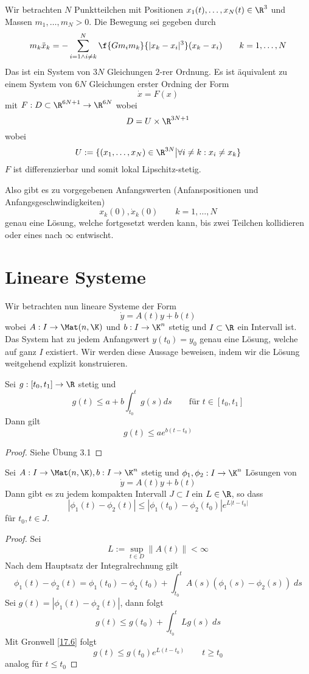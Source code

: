 \documentclass{mycourse}
\begin{document}
\begin{ex*}
	Wir betrachten $N$ Punktteilchen mit Positionen $x_1(t),\dotsc, x_N(t)\in \R^3$ und Massen $m_1,\dotsc,m_N>0$.
	Die Bewegung sei gegeben durch
	\[
		m_k \ddot x_k = -\sum_{i=1 \land i\neq k}^N \f{Gm_im_k}{|x_k-x_i|^3}(x_k-x_i) \qquad k=1,\dotsc, N
	\]
	Das ist ein System von $3N$ Gleichungen $2$-rer Ordnung.
	Es ist äquivalent zu einem System von $6N$ Gleichungen erster Ordning der Form
	\[
		\dot x = F(x)
	\]
	mit $F:D\subset \R^{6N+1}\to \R^{6N}$ wobei
	\[
		D = U \times \R^{3N+1}
	\]
	wobei
	\[
		U := \{(x_1,\dotsc,x_N)\in \R^{3N}\big| \forall i\neq k: x_i\neq x_k \}
	\]
	$F$ ist differenzierbar und somit lokal Lipschitz-stetig.

	Also gibt es zu vorgegebenen Anfangswerten (Anfanspositionen und Anfangsgeschwindigkeiten)
	\[
		x_k(0), \dot x_k(0) \qquad k=1,\dotsc, N
	\]
	genau eine Lösung, welche fortgesetzt werden kann, bis zwei Teilchen kollidieren oder eines nach $\infty$ entwischt.
\end{ex*}


\section{Lineare Systeme}


Wir betrachten nun lineare Systeme der Form
\[
	\dot y = A(t) y + b(t)
\]
wobei $A: I \to \Mat(n,\K)$ und $b :I \to \K^n$ stetig und $I\subset \R$ ein Intervall ist.
Das System hat zu jedem Anfangswert $y(t_0) = y_0$ genau eine Lösung, welche auf ganz $I$ existiert.
Wir werden diese Aussage beweisen, indem wir die Lösung weitgehend explizit konstruieren.

\begin{lem}[Gronwell]
	\label{17.6}
	Sei $g: [t_0,t_1] \to \R$ stetig und
	\[
		g(t) \le a + b\int_{t_0}^t g(s) ds \qquad \text{für $t\in [t_0,t_1]$}
	\]
	Dann gilt
	\[
		g(t) \le ae^{b(t-t_0)}
	\]
	\begin{proof}	
		Siehe Übung 3.1
	\end{proof}
\end{lem}

\begin{st}
	\label{17.7}
	Sei $A:I \to \Mat(n,\K), b:I\to \K^n$ stetig und $\phi_1,\phi_2: I \to \K^n$ Lösungen von
	\[
		\dot y = A(t) y + b(t)
	\]
	Dann gibt es zu jedem kompakten Intervall $J\subset I$ ein $L\in \R$, so dass
	\[
		|\phi_1(t) - \phi_2(t)| \le |\phi_1(t_0) -\phi_2(t_0)| e^{L|t-t_0|}
	\]
	für $t_0, t\in J$.
	\begin{proof}
		Sei
		\[
			L := \sup_{t\in D}\|A(t)\| < \infty
		\]
		Nach dem Hauptsatz der Integralrechnung gilt
		\[
			\phi_1(t) - \phi_2(t) = \phi_1(t_0) - \phi_2(t_0) + \int_{t_0}^t A(s) (\phi_1(s) - \phi_2(s))\; ds
		\]
		Sei $g(t) = |\phi_1(t) - \phi_2(t)|$, dann folgt
		\[
			g(t) \le g(t_0) + \int_{t_0}^tLg(s)\; ds
		\]
		Mit Gronwell \ref{17.6} folgt
		\[
			g(t) \le g(t_0) e^{L(t-t_0)} \qquad t\ge t_0
		\]
		analog für $t\le t_0$

	\end{proof}
\end{st}
\end{document}
